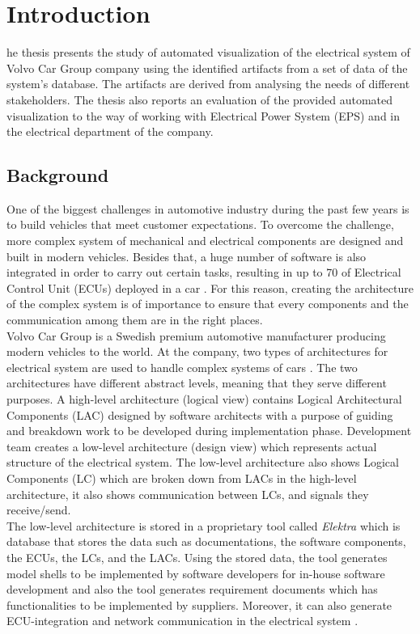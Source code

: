 \chapter{Introduction}
\lettrine[findent=2pt]{}{ }he thesis presents the study of automated visualization of the electrical system of Volvo Car Group company using the identified artifacts from a set of data of the system's database. The artifacts are derived from analysing the needs of different stakeholders. The thesis also reports an evaluation of the provided automated visualization to the way of working with Electrical Power System (EPS) and in the electrical department of the company.

\section{Background}\label{Background_ref}
One of the biggest challenges in automotive industry during the past few years is to build vehicles that meet customer expectations. To overcome the challenge, more complex system of mechanical and electrical components are designed and built in modern vehicles. Besides that, a huge number of software is also integrated in order to carry out certain tasks, resulting in up to 70 of Electrical Control Unit (ECUs) deployed in a car \cite{Beeck}. For this reason, creating the architecture of the complex system is of importance to ensure that every components and the communication among them are in the right places. \\

Volvo Car Group is a Swedish premium automotive manufacturer producing modern vehicles to the world. At the company, two types of architectures for electrical system are used to handle complex systems of cars \cite{Eliasson_1}. The two architectures have different abstract levels, meaning that they serve different purposes. A high-level architecture (logical view) contains Logical Architectural Components (LAC) designed by software architects with a purpose of guiding and breakdown work to be developed during implementation phase. Development team creates a low-level architecture (design view) which represents actual structure of the electrical system. The low-level architecture also shows Logical Components (LC) which are broken down from LACs in the high-level architecture, it also shows communication between LCs, and signals they receive/send. \\

The low-level architecture is stored in a proprietary tool called \textit{Elektra} which is database that stores the data such as documentations, the software components, the ECUs, the LCs, and the LACs. Using the stored data, the tool generates model shells to be implemented by software developers for in-house software development and also the tool generates requirement documents which has functionalities to be implemented by suppliers. Moreover, it can also generate ECU-integration and network communication in the electrical system \cite{Eliasson_2}.\\

